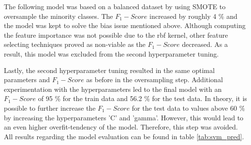 The following model was based on a balanced dataset by using SMOTE to oversample the minority classes. The $F_1-Score$ increased by roughly 4 \% and the model was kept to solve the bias issue mentioned above. Although computing the feature importance was not possible due to the rbf kernel, other feature selecting techniques proved as non-viable as the $F_1-Score$ decreased. As a result, this model was excluded from the second hyperparameter tuning. 

Lastly, the second hyperparameter tuning resulted in the same optimal parameters and $F_1-Score$ as before in the oversampling step. Additional experimentation with the hyperparameters led to the final model with an $F_1-Score$ of 95 \% for the train data and 56.2 \% for the test data. In theory, it is possible to further increase the $F_1-Score$ for the test data to values above 60 \% by increasing the hyperparameters 'C' and 'gamma'. However, this would lead to an even higher overfit-tendency of the model. Therefore, this step was avoided. All results regarding the model evaluation can be found in table \ref{tab:svm_pred}.


